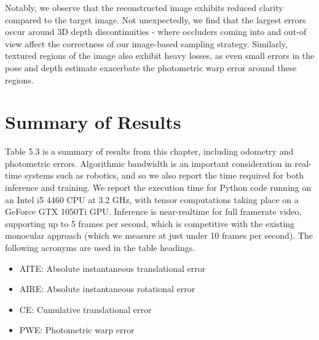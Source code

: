 Notably, we observe that the reconstructed image exhibits reduced clarity compared to the target image. Not unexpectedly, we find that the largest errors occur around 3D depth discontinuities - where occluders coming into and out-of view affect the correctness of our image-based sampling strategy. Similarly, textured regions of the image also exhibit heavy losses, as even small errors in the pose and depth estimate exacerbate the photometric warp error around these regions.

\section{Summary of Results}

Table 5.3 is a summary of results from this chapter, including odometry and photometric errors. Algorithmic bandwidth is an important consideration in real-time systems such as robotics, and so we also report the time required for both inference and training. We report the execution time for Python code running on an Intel i5 4460 CPU at 3.2 GHz, with tensor computations taking place on a GeForce GTX 1050Ti GPU. Inference is near-realtime for full framerate video, supporting up to 5 frames per second, which is competitive with the existing monocular approach (which we measure at just under 10 frames per second). The following acronyms are used in the table headings.

\begin{itemize}
    \item {AITE: Absolute instantaneous translational error}
    \item {AIRE: Absolute instantaneous rotational error}
    \item {CE: Cumulative translational error}
    \item {PWE: Photometric warp error}
\end{itemize}


